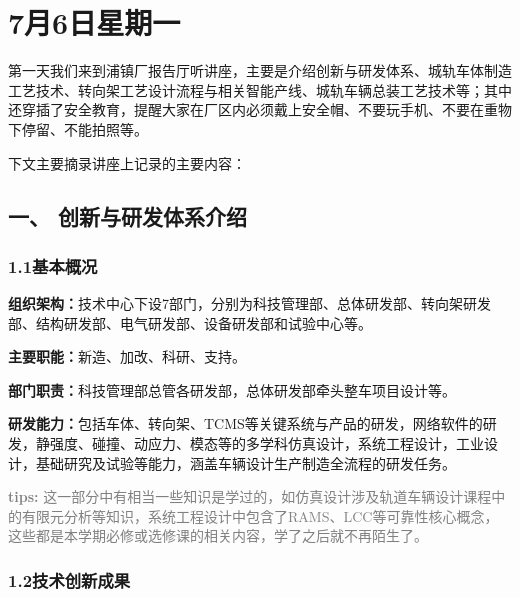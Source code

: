 \documentclass[12pt, oneside, a4paper]{ctexart}
\begin{document}
\newpage
\pagecanvas{}

\newpage
\journalpage
\vspace{-7.5mm}
\hypertarget{journal-day-0706}{}
\section*{7月6日\quad{}星期一}
\diaryJournalBodyFont\vspace{-3mm}\par{}
第一天我们来到浦镇厂报告厅听讲座，主要是介绍创新与研发体系、城轨车体制造工艺技术、转向架工艺设计流程与相关智能产线、城轨车辆总装工艺技术等；其中还穿插了安全教育，提醒大家在厂区内必须戴上安全帽、不要玩手机、不要在重物下停留、不能拍照等。\par{}
下文主要摘录讲座上记录的主要内容：\par{}
\vspace{-5mm}\subsection*{一、 创新与研发体系介绍}
\vspace{-2mm}\subsubsection*{1.1\quad{}基本概况}\vspace{-2mm}
{\bf{}组织架构：}技术中心下设7部门，分别为科技管理部、总体研发部、转向架研发部、结构研发部、电气研发部、设备研发部和试验中心等。\par{}
{\bf{}主要职能：}新造、加改、科研、支持。\par{}
{\bf{}部门职责：}科技管理部总管各研发部，总体研发部牵头整车项目设计等。\par{}
{\bf{}研发能力：}包括车体、转向架、TCMS等关键系统与产品的研发，网络软件的研发，静强度、碰撞、动应力、模态等的多学科仿真设计，系统工程设计，工业设计，基础研究及试验等能力，涵盖车辆设计生产制造全流程的研发任务。\par{}
\textcolor{gray}{{\bf{}tips: }这一部分中有相当一些知识是学过的，如仿真设计涉及轨道车辆设计课程中的有限元分析等知识，系统工程设计中包含了RAMS、LCC等可靠性核心概念，这些都是本学期必修或选修课的相关内容，学了之后就不再陌生了。}\par{}
\vspace{-5mm}\subsubsection*{1.2\quad{}技术创新成果}\vspace{-2mm}
\end{document}
